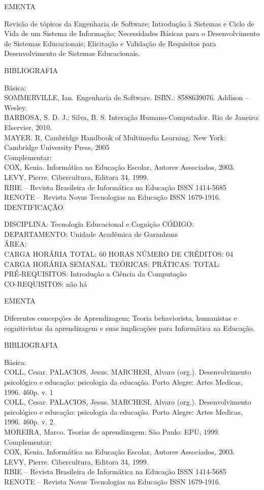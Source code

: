 \documentclass[
	12pt,				%
	openright,			%
  oneside,     %
	a4paper,			%
	english,			%
	french,				%
	spanish,			%
	brazil				%
	]{abntex2}
\begin{document}
\begin{apendicesenv}
EMENTA 

Revisão de tópicos da Engenharia de Software; Introdução à
Sistemas e Ciclo de Vida de um Sistema de Informação;  
Necessidades Básicas para o Desenvolvimento de Sistemas Educacionais; Elicitação e Validação de Requisitos para Desenvolvimento de
Sistemas Educacionais.

BIBLIOGRAFIA 

Básica:\\
SOMMERVILLE, Ian. Engenharia de Software. ISBN.: 8588639076. Addison --
Wesley.\\
BARBOSA, S. D. J.; Silva, B. S. Interação Humano-Computador. Rio de
Janeiro: Elservier, 2010.\\
MAYER. R, Cambridge Handbook of Multimedia Learning. New York: Cambridge
University Press, 2005\\
Complementar:\\
COX, Kenia. Informática na Educação Escolar, Autores Associados, 2003.\\
LEVY, Pierre. Cibercultura, Editora 34, 1999.\\
RBIE -- Revista Brasileira de Informática na Educação ISSN 1414-5685\\
RENOTE -- Revista Novas Tecnologias na Educação ISSN 1679-1916.\\

\newpage IDENTIFICAÇÃO

DISCIPLINA: Tecnologia Educacional e Cognição CÓDIGO:\\ 
DEPARTAMENTO: Unidade Acadêmica de Garanhuns\\
ÁREA: \\
CARGA HORÁRIA TOTAL: 60 HORAS NÚMERO DE CRÉDITOS: 04\\
CARGA HORÁRIA SEMANAL: TEÓRICAS: PRÁTICAS: TOTAL: \\
PRÉ-REQUISITOS: Introdução a Ciência da Computação\\
CO-REQUISITOS: não há

EMENTA 

Diferentes concepções de Aprendizagem; Teoria behaviorista, humanistas e
cognitivistas da aprendizagem e suas implicações para Informática na
Educação.

BIBLIOGRAFIA 

Básica:\\
COLL, Cesar. PALACIOS, Jesus. MARCHESI, Alvaro (org.). Desenvolvimento
psicológico e educação: psicologia da educação. Porto Alegre: Artes
Medicas, 1996. 460p. v. 1\\
COLL, Cesar. PALACIOS, Jesus. MARCHESI, Alvaro (org.). Desenvolvimento
psicológico e educação: psicologia da educação. Porto Alegre: Artes
Medicas, 1996. 460p. v. 2.\\
MOREIRA, Marco. Teorias de aprendizagem. São Paulo: EPU, 1999.\\
Complementar:\\
COX, Kenia. Informática na Educação Escolar, Autores Associados, 2003.\\
LEVY, Pierre. Cibercultura, Editora 34, 1999.\\
RBIE -- Revista Brasileira de Informática na Educação ISSN 1414-5685\\
RENOTE -- Revista Novas Tecnologias na Educação ISSN 1679-1916.


\end{apendicesenv}
\end{document}
